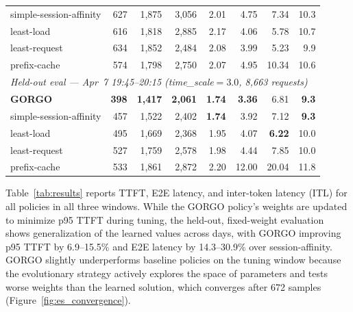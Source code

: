 \documentclass{article}
\begin{document}
\begin{table}[htbp]
\begin{tabular}{lrrrrrrr}
simple-session-affinity & 627          & 1{,}875          & 3{,}056          & 2.01           & 4.75           & 7.34           & 10.3 \\
least-load              & 616          & 1{,}818          & 2{,}885          & 2.17           & 4.06           & 5.78           & 10.7 \\
least-request           & 634          & 1{,}852          & 2{,}484          & 2.08           & 3.99           & 5.23           & 9.9 \\
prefix-cache            & 574          & 1{,}798          & 2{,}750          & 2.07           & 4.95           & 10.34          & 10.6 \\
\midrule
\multicolumn{8}{l}{\textit{Held-out eval --- Apr~7 19:45--20:15 (time\_scale${=}3.0$, 8{,}663 requests)}} \\
\midrule
\textbf{GORGO}          & \textbf{398} & \textbf{1{,}417} & \textbf{2{,}061} & \textbf{1.74}  & \textbf{3.36}  & 6.81           & \textbf{9.3} \\
simple-session-affinity & 457          & 1{,}522          & 2{,}402          & \textbf{1.74}  & 3.92           & 7.12           & \textbf{9.3} \\
least-load              & 495          & 1{,}669          & 2{,}368          & 1.95           & 4.07           & \textbf{6.22}  & 10.0 \\
least-request           & 527          & 1{,}759          & 2{,}578          & 1.98           & 4.44           & 7.85           & 10.0 \\
prefix-cache            & 533          & 1{,}861          & 2{,}872          & 2.20           & 12.00          & 20.04          & 11.8 \\
\bottomrule
\end{tabular}
\end{table}

Table~\ref{tab:results} reports TTFT, E2E latency, and inter-token latency (ITL)
for all policies in all three windows. While the GORGO policy's weights are
updated to minimize p95 TTFT during tuning, the held-out, fixed-weight evaluation
shows generalization of the learned values across days, with GORGO improving p95
TTFT by 6.9--15.5\% and E2E latency by 14.3--30.9\% over session-affinity. GORGO
slightly underperforms baseline policies on the tuning window because the
evolutionary strategy actively explores the space of parameters and tests worse weights than the learned solution, which converges after 672 samples
(Figure~\ref{fig:es_convergence}).
\end{document}
